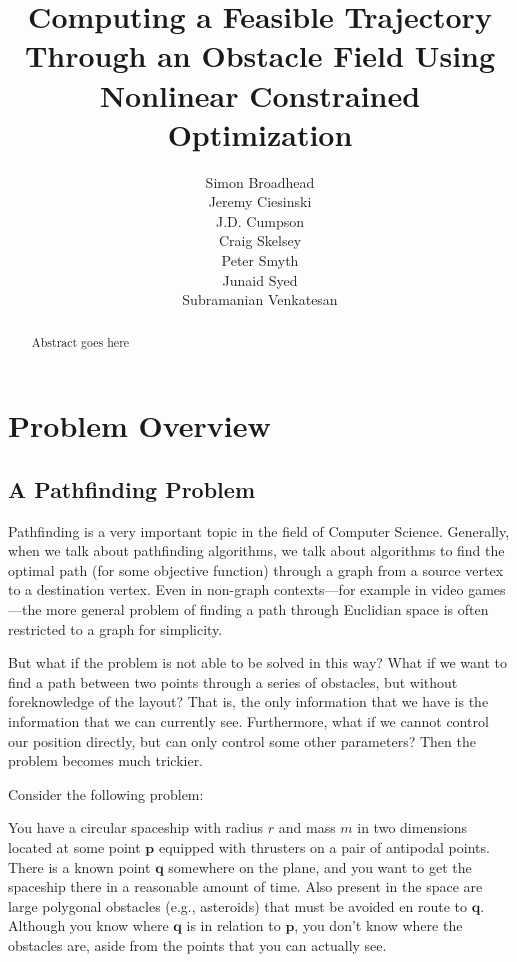 \documentclass{report}
\begin{document}
\title{Computing a Feasible Trajectory Through an Obstacle Field Using Nonlinear Constrained Optimization}
\author{
    Simon Broadhead\\
    Jeremy Ciesinski\\
    J.D. Cumpson\\
    Craig Skelsey\\
    Peter Smyth\\
    Junaid Syed\\
    Subramanian Venkatesan
}
\maketitle

\begin{abstract}
Abstract goes here
\end{abstract}

\chapter{Problem Overview}
\section{A Pathfinding Problem}
Pathfinding is a very important topic in the field of Computer Science.
Generally, when we talk about pathfinding algorithms, we talk about
algorithms to find the optimal path (for some objective function) through
a graph from a source vertex to a destination vertex. Even in
non-graph contexts---for example in video games---the more general problem
of finding a path through Euclidian space is often restricted to a graph
for simplicity.

But what if the problem is not able to be solved in this way? What if
we want to find a path between two points through a series of obstacles,
but without foreknowledge of the layout? That is, the only information
that we have is the information that we can currently see. Furthermore,
what if we cannot control our position directly, but can only control
some other parameters? Then the problem becomes much trickier.
\vspace{0.5em}

Consider the following problem:
\vspace{0.5em}

You have a circular spaceship with radius $r$ and mass $m$
in two dimensions located at some point $\mathbf{p}$ equipped with thrusters
on a pair of antipodal points. There
is a known point $\mathbf{q}$ somewhere on the plane, and you want to
get the spaceship there in a reasonable amount of time. Also present
in the space are large polygonal obstacles (e.g., asteroids) 
that must be avoided en route
to $\mathbf{q}$. Although you know where $\mathbf{q}$ is in relation to
$\mathbf{p}$, you don't know where the obstacles are, aside from the
points that you can actually see.
\end{document}
